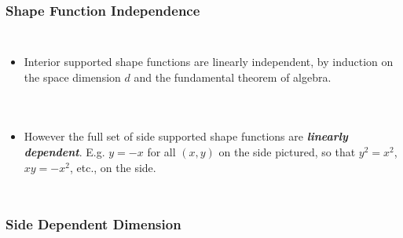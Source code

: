 \documentclass[compress]{beamer}
\begin{document}
\begin{frame}
  \frametitle{Shape Function Independence}
  \begin{columns}
      \pause
      \begin{itemize}[<+->]
        \item Interior supported shape functions are linearly independent, by induction on the space dimension $d$ and
          the fundamental theorem of algebra.
      \end{itemize}
  \end{columns}
  \uncover<+-> {
    \begin{columns}
      \begin{itemize}[<+->]
        \item However the full set of side supported shape functions are \emph{\textbf{linearly dependent}}. E.g. $y=-x$ for all $(x,y)$ on the side pictured,
          so that $y^2=x^2$, $x y = -x^2$, etc.,  on the side.
      \end{itemize}
    \end{columns}
  }
\end{frame}

\subsubsection{Side Dependent Dimension}
\end{document}
